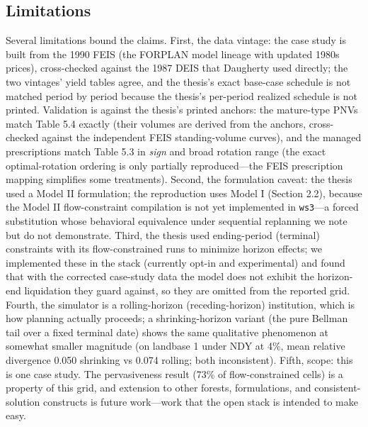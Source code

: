\hypertarget{limitations}{%
\subsection{Limitations}\label{limitations}}

Several limitations bound the claims. First, the data vintage: the case study is built from the 1990 FEIS (the FORPLAN model lineage with updated 1980s prices), cross-checked against the 1987 DEIS that Daugherty used directly; the two vintages' yield tables agree, and the thesis's exact base-case schedule is not matched period by period because the thesis's per-period realized schedule is not printed. Validation is against the thesis's printed anchors: the mature-type PNVs match Table 5.4 exactly (their volumes are derived from the anchors, cross-checked against the independent FEIS standing-volume curves), and the managed prescriptions match Table 5.3 in \emph{sign} and broad rotation range (the exact optimal-rotation ordering is only partially reproduced---the FEIS prescription mapping simplifies some treatments). Second, the formulation caveat: the thesis used a Model II formulation; the reproduction uses Model I (Section 2.2), because the Model II flow-constraint compilation is not yet implemented in \texttt{ws3}---a forced substitution whose behavioral equivalence under sequential replanning we note but do not demonstrate. Third, the thesis used ending-period (terminal) constraints with its flow-constrained runs to minimize horizon effects; we implemented these in the stack (currently opt-in and experimental) and found that with the corrected case-study data the model does not exhibit the horizon-end liquidation they guard against, so they are omitted from the reported grid. Fourth, the simulator is a rolling-horizon (receding-horizon) institution, which is how planning actually proceeds; a shrinking-horizon variant (the pure Bellman tail over a fixed terminal date) shows the same qualitative phenomenon at somewhat smaller magnitude (on landbase 1 under NDY at 4\%, mean relative divergence 0.050 shrinking vs 0.074 rolling; both inconsistent). Fifth, scope: this is one case study. The pervasiveness result (73\% of flow-constrained cells) is a property of this grid, and extension to other forests, formulations, and consistent-solution constructs is future work---work that the open stack is intended to make easy.
